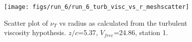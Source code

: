 \begin{figure}[H]
\centering
\texttt{[image: figs/run\_6/run\_6\_turb\_visc\_vs\_r\_meshscatter]}
\caption{Scatter plot of $\nu_T$ vs radius as calculated from the turbulent viscosity hypothesis. $z/c$=5.37, $V_{free}$=24.86, station 1.}
\label{fig:run_6_turb_visc_vs_r_meshscatter}
\end{figure}



